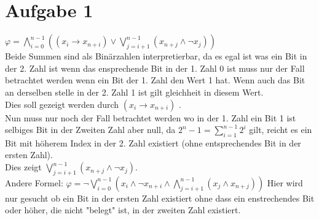 \section*{Aufgabe 1}


$\varphi = \bigwedge_{i=0}^{n-1}((x_i \rightarrow x_{n+i}) \vee \bigvee_{j=i+1}^{n-1}( x_{n+j} \wedge \neg x_{j}))$ \\



Beide Summen sind als Binärzahlen interpretierbar, da es egal ist was ein Bit in der 2. Zahl ist wenn das ensprechende Bit in der 1. Zahl 0 ist muss nur der Fall betrachtet werden wenn ein Bit der 1. Zahl den Wert 1 hat. Wenn auch das Bit an derselben stelle in der 2. Zahl 1 ist gilt gleichheit in diesem Wert.\\

Dies soll gezeigt werden durch $(x_i \rightarrow x_{n+i})$ .\\


Nun muss nur noch der Fall betrachtet werden wo in der 1. Zahl ein Bit 1 ist selbiges Bit in der Zweiten Zahl aber null, da $2^n-1 = \sum_{i=1}^{n-1}2^i$ gilt, reicht es ein Bit mit höherem Index in der 2. Zahl  existiert (ohne entsprechendes Bit in der ersten Zahl).\\

Dies zeigt $ \bigvee_{j=i+1}^{n-1}( x_{n+j} \wedge \neg x_{j})$. \\



Andere Formel: $ \varphi = \neg \bigvee_{i=0}^{n-1}(x_i \wedge \neg x_{n+i} \wedge \bigwedge_{j=i+1}^{n-1} (x_j \wedge x_{n+j}))$ 
Hier wird nur gesucht ob ein Bit in der ersten Zahl existiert ohne dass ein enstrechendes Bit oder höher, die nicht "belegt" ist, in der zweiten Zahl existiert.